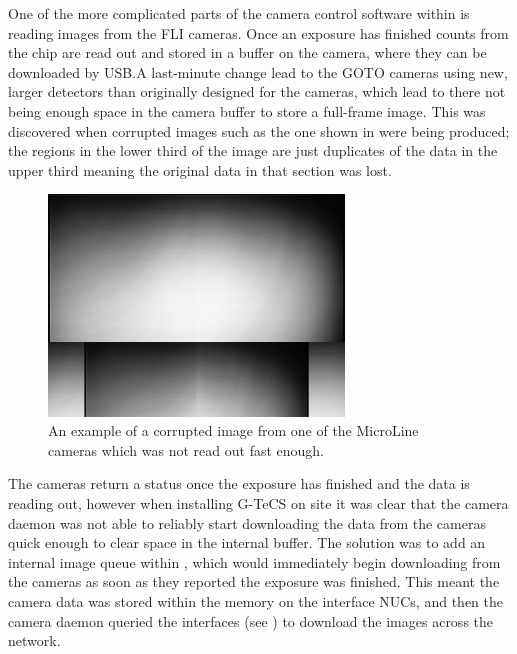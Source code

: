 \begin{colsection}
\begin{colsection}
One of the more complicated parts of the camera control software within  is reading images from the FLI cameras. Once an exposure has finished counts from the chip are read out and stored in a buffer on the camera, where they can be downloaded by USB.\@ A last-minute change lead to the GOTO cameras using new, larger detectors than originally designed for the cameras, which lead to there not being enough space in the camera buffer to store a full-frame image. This was discovered when corrupted images such as the one shown in  were being produced; the regions in the lower third of the image are just duplicates of the data in the upper third meaning the original data in that section was lost.

\begin{figure}[t]
    \begin{center}
        \includegraphics[width=0.7\textwidth]{images/cam_readout.png}
    \end{center}
    \caption[A corrupted image which was not read out fast enough]{
        An example of a corrupted image from one of the MicroLine cameras which was not read out fast enough.
    }\label{fig:cam_readout}
\end{figure}

The cameras return a  status once the exposure has finished and the data is reading out, however when installing G-TeCS on site it was clear that the camera daemon was not able to reliably start downloading the data from the cameras quick enough to clear space in the internal buffer. The solution was to add an internal image queue within , which would immediately begin downloading from the cameras as soon as they reported the exposure was finished. This meant the camera data was stored within the memory on the interface NUCs, and then the camera daemon queried the  interfaces (see ) to download the images across the network.


\end{colsection}
\end{colsection}
